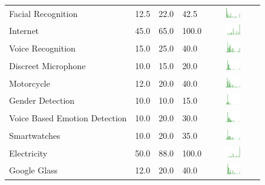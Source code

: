 \begin{table}[t]
\begin{center}
\begin{tabular}{| p{2cm} | p{1cm} | p{1cm} | p{1cm} | c |}
Facial Recognition  & 12.5 & 22.0 & 42.5 & \includegraphics[width = 2cm, height = 0.5cm]{tables/facialrecognitionben} \\ 
Internet  & 45.0 & 65.0 & 100.0 & \includegraphics[width = 2cm, height = 0.5cm]{tables/internetben} \\ 
Voice Recognition  & 15.0 & 25.0 & 40.0 & \includegraphics[width = 2cm, height = 0.5cm]{tables/voicerecognitionben} \\ 
Discreet Microphone  & 10.0 & 15.0 & 20.0 & \includegraphics[width = 2cm, height = 0.5cm]{tables/discreetmicrophoneben} \\ 
Motorcycle & 12.0 & 20.0 & 40.0 & \includegraphics[width = 2cm, height = 0.5cm]{tables/MotorcycleBenefit} \\ 
Gender Detection  & 10.0 & 10.0 & 15.0 & \includegraphics[width = 2cm, height = 0.5cm]{tables/genderdetectionben} \\ 
Voice Based Emotion Detection  & 10.0 & 20.0 & 30.0 & \includegraphics[width = 2cm, height = 0.5cm]{tables/voicebasedemotiondetectionben} \\ 
Smartwatches  & 10.0 & 20.0 & 35.0 & \includegraphics[width = 2cm, height = 0.5cm]{tables/smartwatchesben} \\ 
Electricity & 50.0 & 88.0 & 100.0 & \includegraphics[width = 2cm, height = 0.5cm]{tables/ElectricityBenefit} \\ 
Google Glass  & 12.0 & 20.0 & 40.0 & \includegraphics[width = 2cm, height = 0.5cm]{tables/googleglassben} \\ 

\end{tabular}
\end{center}
\end{table}
